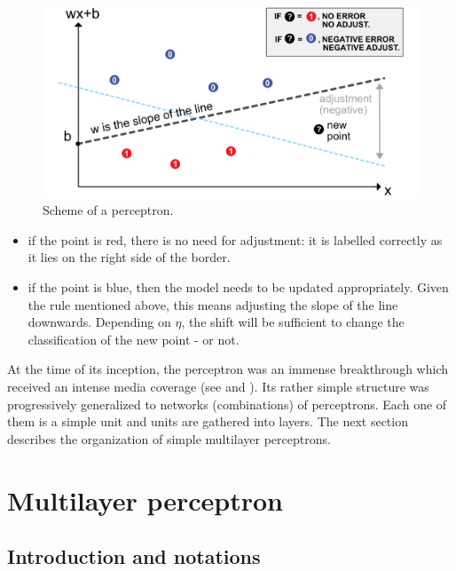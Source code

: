\documentclass[]{krantz}
\providecommand{\tightlist}{%
  \setlength{\itemsep}{0pt}\setlength{\parskip}{0pt}}
\theoremstyle{definition}
\theoremstyle{definition}
\theoremstyle{definition}
\theoremstyle{remark}
\begin{document}
\begin{figure}[H]

{\centering \includegraphics[width=450px]{images/NN_percep_scheme} 

}

\caption{Scheme of a perceptron.}\label{fig:perceptron}
\end{figure}

\begin{itemize}
\tightlist
\item
  if the point is red, there is no need for adjustment: it is labelled
  correctly as it lies on the right side of the border.\\
\item
  if the point is blue, then the model needs to be updated
  appropriately. Given the rule mentioned above, this means adjusting
  the slope of the line downwards. Depending on \(\eta\), the shift will
  be sufficient to change the classification of the new point - or not.
\end{itemize}

At the time of its inception, the perceptron was an immense breakthrough
which received an intense media coverage (see
\citet{olazaran1996sociological} and \citet{anderson2000talking}). Its
rather simple structure was progressively generalized to networks
(combinations) of perceptrons. Each one of them is a simple unit and
units are gathered into layers. The next section describes the
organization of simple multilayer perceptrons.

\hypertarget{multilayer-perceptron}{%
\section{Multilayer perceptron}\label{multilayer-perceptron}}

\hypertarget{introduction-and-notations}{%
\subsection{Introduction and
notations}\label{introduction-and-notations}}
\end{document}
